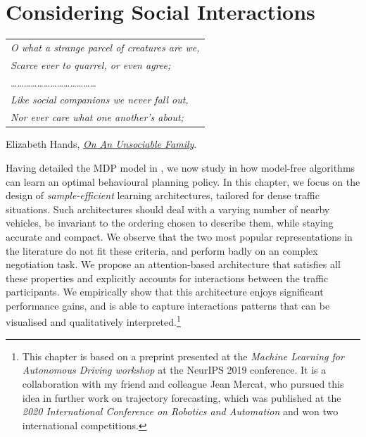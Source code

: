 
\graphicspath{{2-Chapters/4-Chapter/}}


\chapter{Considering Social Interactions}
\label{chapter:4}

\begin{flushright}
	\begin{tabular}{@{}l@{}}
		\emph{O what a strange parcel of creatures are we,}\\
		\emph{Scarce ever to quarrel, or even agree;}\\
		\dots\dots\dots\dots\dots\dots\dots\dots\dots\dots\dots\dots\dots\\
		\emph{Like social companions we never fall out,}\\
		\emph{Nor ever care what one another’s about;}\\
	\end{tabular}
	
	Elizabeth Hands, \href{https://eleurent.github.io/sisyphe/texts/unsociable_family.html}{\emph{On An Unsociable Family}}.
\end{flushright}

\abstractStartChapter{}%
Having detailed the \gls{MDP} model in , we now study in  how model-free  algorithms can learn an optimal behavioural planning policy. In this chapter, we focus on the design of \emph{sample-efficient} learning architectures, tailored for dense traffic situations. Such architectures should deal with a varying number of nearby vehicles, be invariant to the ordering chosen to describe them, while staying accurate and compact. We observe that the two most popular representations in the literature do not fit these criteria, and perform badly on an complex negotiation task. We propose an attention-based architecture that satisfies all these properties and explicitly accounts for interactions between the traffic participants. We empirically show that this architecture enjoys significant performance gains, and is able to capture interactions patterns that can be visualised and qualitatively interpreted.\footnote{This chapter is based on a preprint \citep{Leurent2019social} presented at the \emph{Machine Learning for Autonomous Driving workshop} at the NeurIPS 2019 conference. It is a collaboration with my friend and colleague Jean Mercat, who pursued this idea in further work on trajectory forecasting, which was published at the \emph{2020 International Conference on Robotics and Automation} \citep{Mercat2020} and won two international competitions.}
\minitocStartChapterNoNewPage{}

